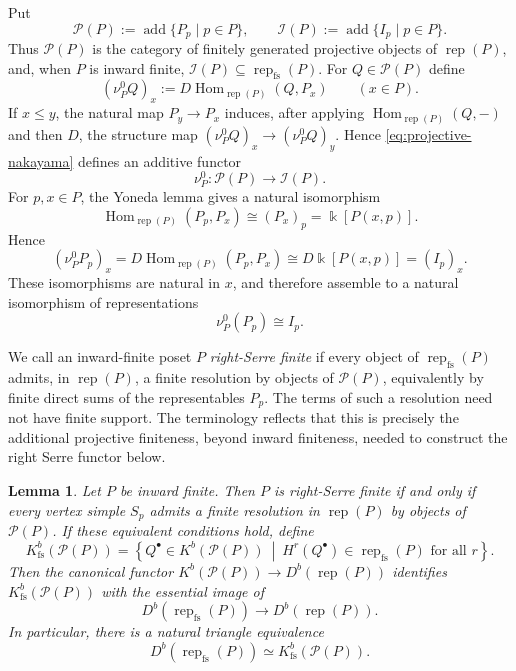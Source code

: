 \documentclass[12pt,reqno]{amsart}
\newtheorem{lemma}[theorem]{Lemma}
\theoremstyle{definition}
\theoremstyle{remark}
\newcommand{\Rep}{\operatorname{rep}}
\newcommand{\Hom}{\operatorname{Hom}}
\begin{document}
Put
\[
\mathcal P(P):=\operatorname{add}\{P_p\mid p\in P\},
\qquad
\mathcal I(P):=\operatorname{add}\{I_p\mid p\in P\}.
\]
Thus $\mathcal P(P)$ is the category of finitely generated projective objects
of $\Rep(P)$, and, when $P$ is inward finite,
$\mathcal I(P)\subseteq\Rep_{\mathrm{fs}}(P)$.  For
$Q\in\mathcal P(P)$ define
\begin{equation}\label{eq:projective-nakayama}
(\nu_P^0 Q)_x
:=
D\Hom_{\Rep(P)}(Q,P_x)
\qquad(x\in P).
\end{equation}
If $x\le y$, the natural map $P_y\to P_x$ induces, after applying
$\Hom_{\Rep(P)}(Q,-)$ and then $D$, the structure map
$(\nu_P^0Q)_x\to(\nu_P^0Q)_y$.  Hence \eqref{eq:projective-nakayama} defines
an additive functor
\[
\nu_P^0:\mathcal P(P)\longrightarrow\mathcal I(P).
\]
For $p,x\in P$, the Yoneda lemma gives a natural isomorphism
\[
\Hom_{\Rep(P)}(P_p,P_x)
\cong
(P_x)_p
=
\Bbbk[P(x,p)].
\]
Hence
\[
(\nu_P^0P_p)_x
=
D\Hom_{\Rep(P)}(P_p,P_x)
\cong
D\Bbbk[P(x,p)]
=
(I_p)_x.
\]
These isomorphisms are natural in $x$, and therefore assemble to a natural
isomorphism of representations
\[
\nu_P^0(P_p)\cong I_p.
\]

We call an inward-finite poset $P$ \emph{right-Serre finite} if every object
of $\Rep_{\mathrm{fs}}(P)$ admits, in $\Rep(P)$, a finite resolution by
objects of $\mathcal P(P)$, equivalently by finite direct sums of the
representables $P_p$.  The terms of such a resolution need not have finite
support.  The terminology reflects that this is precisely the additional
projective finiteness, beyond inward finiteness, needed to construct the
right Serre functor below.

\begin{lemma}
\label{lem:right-serre-model}
Let $P$ be inward finite.  Then $P$ is right-Serre finite if and only if every
vertex simple $S_p$ admits a finite resolution in $\Rep(P)$ by objects of
$\mathcal P(P)$.  If these equivalent conditions hold, define
\[
K^b_{\mathrm{fs}}(\mathcal P(P))
=
\left\{
Q^\bullet\in K^b(\mathcal P(P))\ \middle|\
H^r(Q^\bullet)\in\Rep_{\mathrm{fs}}(P)\text{ for all }r
\right\}.
\]
Then the canonical functor
$K^b(\mathcal P(P))\to D^b(\Rep(P))$ identifies
$K^b_{\mathrm{fs}}(\mathcal P(P))$ with the essential image of
\[
D^b(\Rep_{\mathrm{fs}}(P))\longrightarrow D^b(\Rep(P)).
\]
In particular, there is a natural triangle equivalence
\begin{equation}\label{eq:bounded-projective-model}
D^b(\Rep_{\mathrm{fs}}(P))
\simeq
K^b_{\mathrm{fs}}(\mathcal P(P)).
\end{equation}
\end{lemma}
\end{document}
